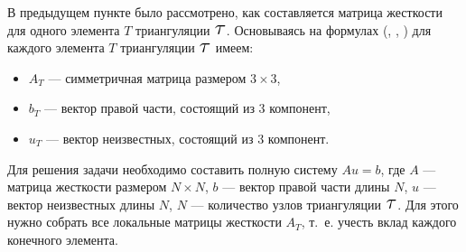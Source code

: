 \documentclass[12pt, a4paper]{article}
\newcommand\Tau{\scalerel*{\tau}{T}}
\begin{document}
				В предыдущем пункте было рассмотрено, как составляется матрица жесткости для одного элемента $T$ триангуляции $\Tau$. Основываясь на формулах (, , ) для каждого элемента $T$ триангуляции $\Tau$  имеем: 
				\begin{itemize}
					\item $A_T$ --- симметричная матрица размером $3 \times 3$,
					\item $b_T$ --- вектор правой части, состоящий из 3 компонент,
					\item $u_T$ --- вектор неизвестных, состоящий из 3 компонент.
				\end{itemize}
								
				\noindent
				Для решения задачи необходимо составить полную систему $Au = b$, где $A$ --- матрица жесткости размером $N \times N$, $b$ --- вектор правой части длины $N$, $u$ --- вектор неизвестных длины $N$, $N$ --- количество узлов триангуляции $\Tau$. Для этого нужно собрать все локальные матрицы жесткости $A_T$, т.~е. учесть вклад каждого конечного элемента.
				
\end{document}
